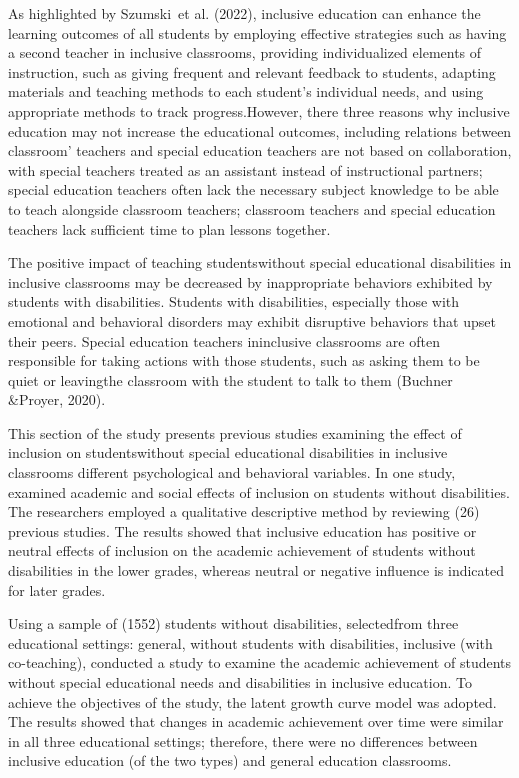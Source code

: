 \documentclass[10pt]{NSP1}
\begin{document}
As highlighted by Szumski~et al. (2022), inclusive education can enhance the learning outcomes of all students by employing effective strategies such as having a second teacher in inclusive classrooms, providing individualized elements of instruction, such as giving frequent and relevant feedback to students, adapting materials and teaching methods to each student's individual needs, and using appropriate methods to track progress.However, there three reasons why inclusive education may not increase the educational outcomes, including relations between classroom' teachers and special education teachers are not based on collaboration, with special teachers treated as an assistant instead of instructional partners; special education teachers often lack the necessary subject knowledge to be able to teach alongside classroom teachers; classroom teachers and special education teachers lack sufficient time to plan lessons together.

The positive impact of teaching studentswithout special educational disabilities in inclusive classrooms may be decreased by inappropriate behaviors exhibited by students with disabilities. Students with disabilities, especially those with emotional and behavioral disorders may exhibit disruptive behaviors that upset their peers. Special education teachers ininclusive classrooms are often responsible for taking actions with those students, such as asking them to be quiet or leavingthe classroom with the student to talk to them (Buchner \&Proyer, 2020).

\par\medskip{}\smallskip

This section of the study presents previous studies examining the effect of inclusion on studentswithout special educational disabilities in inclusive classrooms different psychological and behavioral variables. In one study, \cite{12} examined academic and social effects of inclusion on students without disabilities. The researchers employed a qualitative descriptive method by reviewing (26) previous studies. The results showed that inclusive education has positive or neutral effects of inclusion on the academic achievement of students without disabilities in the lower grades, whereas neutral or negative influence is indicated for later grades.

Using a sample of (1552) students without disabilities, selectedfrom three educational settings: general, without students with disabilities, inclusive (with co-teaching),\cite{20} conducted a study to examine the academic achievement of students without special educational needs and disabilities in inclusive education. To achieve the objectives of the study, the latent growth curve model was adopted. The results showed that changes in academic achievement over time were similar in all three educational settings; therefore, there were no differences between inclusive education (of the two types) and general education classrooms.
\end{document}
